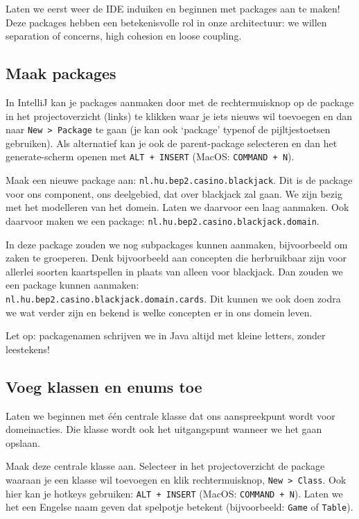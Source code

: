 Laten we eerst weer de IDE induiken en beginnen met packages aan te maken!
Deze packages hebben een betekenisvolle rol in onze architectuur: 
we willen separation of concerns, high cohesion en loose coupling.

\subsection{Maak packages}
In IntelliJ kan je packages aanmaken door met de rechtermuisknop op de package
in het projectoverzicht (links) te klikken waar je iets nieuws wil toevoegen
en dan naar \texttt{New > Package} te gaan (je kan ook `package' typenof de pijltjestoetsen gebruiken). 
Als alternatief kan je ook de parent-package selecteren en dan 
het generate-scherm openen met \texttt{ALT + INSERT} (MacOS: \texttt{COMMAND + N}). 

Maak een nieuwe package aan: \texttt{nl.hu.bep2.casino.blackjack}.
Dit is de package voor ons component, ons deelgebied, dat over blackjack zal gaan.
We zijn bezig met het modelleren van het domein. Laten we daarvoor een laag aanmaken.
Ook daarvoor maken we een package: \texttt{nl.hu.bep2.casino.blackjack.domain}.

In deze package zouden we nog subpackages kunnen aanmaken, bijvoorbeeld om zaken te groeperen.
Denk bijvoorbeeld aan concepten die herbruikbaar zijn voor allerlei soorten kaartspellen 
in plaats van alleen voor blackjack. Dan zouden we een package kunnen aanmaken: 
\\ \texttt{nl.hu.bep2.casino.blackjack.domain.cards}. Dit kunnen we ook doen zodra we 
wat verder zijn en bekend is welke concepten er in ons domein leven.

Let op: packagenamen schrijven we in Java altijd met kleine letters,
zonder leestekens!

\subsection{Voeg klassen en enums toe}
Laten we beginnen met één centrale klasse dat ons aanspreekpunt wordt
voor domeinacties. Die klasse wordt ook het uitgangspunt wanneer we het gaan opslaan.

Maak deze centrale klasse aan. Selecteer in het projectoverzicht de 
package waaraan je een klasse wil toevoegen en klik rechtermuisknop, \texttt{New > Class}. 
Ook hier kan je hotkeys gebruiken: \texttt{ALT + INSERT} (MacOS: \texttt{COMMAND + N}).
Laten we het een Engelse naam geven dat spelpotje betekent (bijvoorbeeld: \texttt{Game} of \texttt{Table}).

